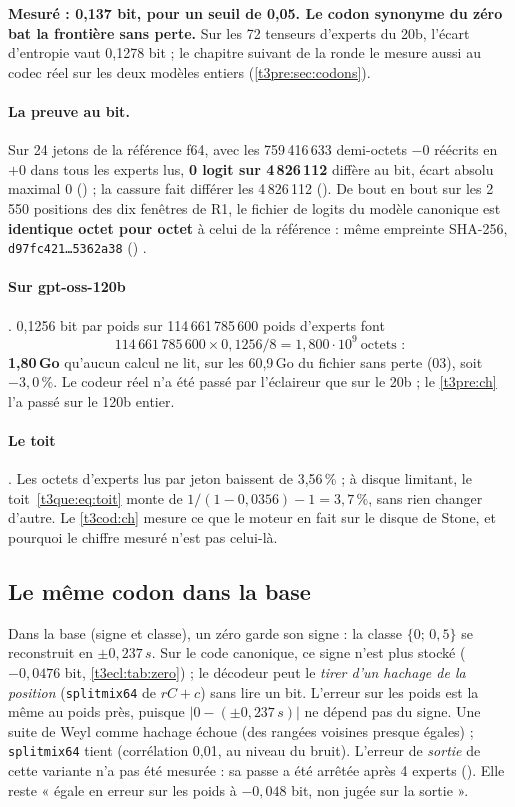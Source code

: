 \textbf{Mesuré : 0,137 bit, pour un seuil de 0,05. Le codon synonyme du zéro bat la frontière sans perte.} Sur les 72 tenseurs d'experts du 20b, l'écart d'entropie vaut 0,1278 bit ; le chapitre suivant de la ronde le mesure aussi au codec réel sur les deux modèles entiers (\cref{t3pre:sec:codons}).

\paragraph{La preuve au bit.} Sur 24 jetons de la référence f64, avec les 759\,416\,633 demi-octets $-0$ réécrits en $+0$ dans tous les experts lus, \textbf{0 logit sur 4\,826\,112} diffère au bit, écart absolu maximal 0 () ; la cassure fait différer les 4\,826\,112 (). De bout en bout sur les 2\,550 positions des dix fenêtres de R1, le fichier de logits du modèle canonique est \textbf{identique octet pour octet} à celui de la référence : même empreinte SHA-256, \texttt{d97fc421\ldots 5362a38} () \mes.

\paragraph{Sur gpt-oss-120b} \calc. 0,1256 bit par poids sur 114\,661\,785\,600 poids d'experts font
\[ 114\,661\,785\,600 \times 0{,}1256 / 8 = 1{,}800\cdot10^{9} \ \text{octets :} \] \textbf{1,80\,Go} qu'aucun calcul ne lit, sur les 60,9\,Go du fichier sans perte (03), soit $-3{,}0\,\%$. Le codeur réel n'a été passé par l'éclaireur que sur le 20b ; le \cref{t3pre:ch} l'a passé sur le 120b entier.

\paragraph{Le toit} \calc. Les octets d'experts lus par jeton baissent de 3,56\,\% ; à disque limitant, le toit~\eqref{t3que:eq:toit} monte de $1/(1 - 0{,}0356) - 1 = 3{,}7\,\%$, sans rien changer d'autre. Le \cref{t3cod:ch} mesure ce que le moteur en fait sur le disque de Stone, et pourquoi le chiffre mesuré n'est pas celui-là.

\subsection{Le même codon dans la base}

Dans la base (signe et classe), un zéro garde son signe : la classe $\{0;\,0{,}5\}$ se reconstruit en $\pm0{,}237\,s$. Sur le code canonique, ce signe n'est plus stocké ($-0{,}0476$ bit, \cref{t3ecl:tab:zero}) ; le décodeur peut le \emph{tirer d'un hachage de la position} (\texttt{splitmix64} de $rC + c$) sans lire un bit. L'erreur sur les poids est la même au poids près, puisque $|0 - (\pm0{,}237\,s)|$ ne dépend pas du signe. Une suite de Weyl comme hachage échoue (des rangées voisines presque égales) ; \texttt{splitmix64} tient (corrélation 0,01, au niveau du bruit). L'erreur de \emph{sortie} de cette variante n'a pas été mesurée : sa passe a été arrêtée après 4 experts (). Elle reste « égale en erreur sur les poids à $-0{,}048$ bit, non jugée sur la sortie ».


